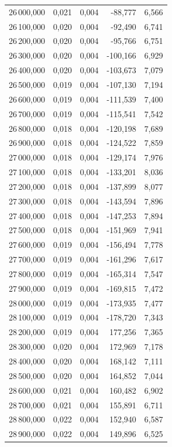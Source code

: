 \begin{longtable}{rrrrr}
26\,000,000 & 0,021 & 0,004 & -88,777 & 6,566\\
26\,100,000 & 0,020 & 0,004 & -92,490 & 6,741\\
26\,200,000 & 0,020 & 0,004 & -95,766 & 6,751\\
26\,300,000 & 0,020 & 0,004 & -100,166 & 6,929\\
26\,400,000 & 0,020 & 0,004 & -103,673 & 7,079\\
26\,500,000 & 0,019 & 0,004 & -107,130 & 7,194\\
26\,600,000 & 0,019 & 0,004 & -111,539 & 7,400\\
26\,700,000 & 0,019 & 0,004 & -115,541 & 7,542\\
26\,800,000 & 0,018 & 0,004 & -120,198 & 7,689\\
26\,900,000 & 0,018 & 0,004 & -124,522 & 7,859\\
27\,000,000 & 0,018 & 0,004 & -129,174 & 7,976\\
27\,100,000 & 0,018 & 0,004 & -133,201 & 8,036\\
27\,200,000 & 0,018 & 0,004 & -137,899 & 8,077\\
27\,300,000 & 0,018 & 0,004 & -143,594 & 7,896\\
27\,400,000 & 0,018 & 0,004 & -147,253 & 7,894\\
27\,500,000 & 0,018 & 0,004 & -151,969 & 7,941\\
27\,600,000 & 0,019 & 0,004 & -156,494 & 7,778\\
27\,700,000 & 0,019 & 0,004 & -161,296 & 7,617\\
27\,800,000 & 0,019 & 0,004 & -165,314 & 7,547\\
27\,900,000 & 0,019 & 0,004 & -169,815 & 7,472\\
28\,000,000 & 0,019 & 0,004 & -173,935 & 7,477\\
28\,100,000 & 0,019 & 0,004 & -178,720 & 7,343\\
28\,200,000 & 0,019 & 0,004 & 177,256 & 7,365\\
28\,300,000 & 0,020 & 0,004 & 172,969 & 7,178\\
28\,400,000 & 0,020 & 0,004 & 168,142 & 7,111\\
28\,500,000 & 0,020 & 0,004 & 164,852 & 7,044\\
28\,600,000 & 0,021 & 0,004 & 160,482 & 6,902\\
28\,700,000 & 0,021 & 0,004 & 155,891 & 6,711\\
28\,800,000 & 0,022 & 0,004 & 152,940 & 6,587\\
28\,900,000 & 0,022 & 0,004 & 149,896 & 6,525\\

\end{longtable}
